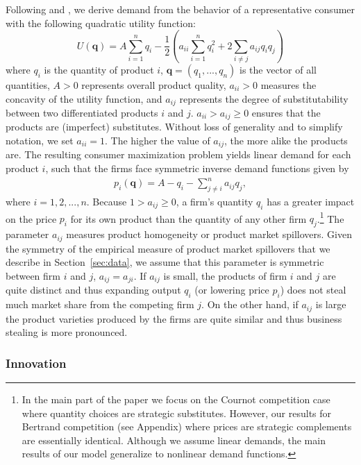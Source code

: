 \documentclass[12pt]{article}
\begin{document}
Following \cite{singhvives1984} and \cite{hackner2000}, we derive demand from the behavior of a representative consumer with the following quadratic utility function:
\begin{equation}\label{eq:representative}
U(\mathbf{q}) = A \sum_{i=1}^{n} q_{i} - \frac{1}{2}\left(a_{ii} \sum_{i=1}^{n} q_{i}^{2} + 2 \sum_{i \neq j} a_{ij} q_{i} q_{j}\right)
\end{equation}
where $q_i$ is the quantity of product $i$, $\mathbf{q}=(q_{1},...,q_{n})$ is the vector of all quantities, $A > 0$ represents overall product quality, $a_{ii} > 0$ measures the concavity of the utility function, and $a_{ij}$ represents the degree of substitutability between two differentiated products $i$ and $j$. $a_{ii} > a_{ij} \geq 0$ ensures that the products are (imperfect) substitutes. Without loss of generality and to simplify notation, we set $a_{ii} = 1$. The higher the value of $a_{ij}$, the more alike the products are. The resulting consumer maximization problem yields linear demand for each product $i$, such that the firms face symmetric inverse demand functions given by
\begin{align}\label{eq:market_demand}
p_{i}(\mathbf{q}) = A - q_{i} - \sum_{j \neq i}^{n} a_{ij} q_{j},
\end{align}
where $i = 1, 2, ..., n$. Because $1 > a_{ij} \geq 0$, a firm's quantity $q_{i}$ has a greater impact on the price $p_{i}$ for its own product than the quantity of any other firm $q_{j}$.\footnote{In the main part of the paper we focus on the Cournot competition case where quantity choices are strategic substitutes. However, our results for Bertrand competition (see Appendix) where prices are strategic complements are essentially identical. Although we assume linear demands, the main results of our model generalize to nonlinear demand functions.} The parameter $a_{ij}$ measures product homogeneity or product market spillovers. Given the symmetry of the empirical measure of product market spillovers \citep{bloom2013} that we describe in Section~\ref{sec:data}, we assume that this parameter is symmetric between firm $i$ and $j$, $a_{ij} = a_{ji}$. If $a_{ij}$ is small, the products of firm $i$ and $j$ are quite distinct and thus expanding output $q_{i}$ (or lowering price $p_{i}$) does not steal much market share from the competing firm $j$. On the other hand, if $a_{ij}$ is large the product varieties produced by the firms are quite similar and thus business stealing is more pronounced.

\subsubsection{Innovation}
\end{document}
